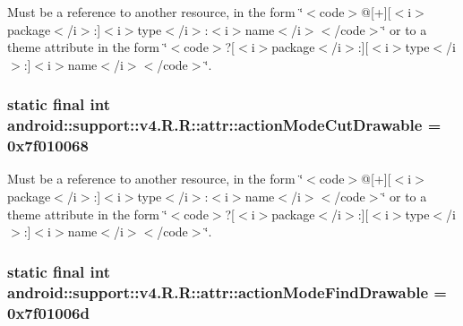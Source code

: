 Must be a reference to another resource, in the form \char`\"{}$<$code$>$@\mbox{[}+\mbox{]}\mbox{[}$<$i$>$package$<$/i$>$:\mbox{]}$<$i$>$type$<$/i$>$:$<$i$>$name$<$/i$>$$<$/code$>$\char`\"{} or to a theme attribute in the form \char`\"{}$<$code$>$?\mbox{[}$<$i$>$package$<$/i$>$:\mbox{]}\mbox{[}$<$i$>$type$<$/i$>$:\mbox{]}$<$i$>$name$<$/i$>$$<$/code$>$\char`\"{}. \hypertarget{classandroid_1_1support_1_1v4_1_1_r_1_1attr_af0edb67fe898da7c0809a12b872b24d}{
\subsubsection[{actionModeCutDrawable}]{\setlength{\rightskip}{0pt plus 5cm}static final int android::support::v4.R.R::attr::actionModeCutDrawable = 0x7f010068}}
\label{classandroid_1_1support_1_1v4_1_1_r_1_1attr_af0edb67fe898da7c0809a12b872b24d}


Must be a reference to another resource, in the form \char`\"{}$<$code$>$@\mbox{[}+\mbox{]}\mbox{[}$<$i$>$package$<$/i$>$:\mbox{]}$<$i$>$type$<$/i$>$:$<$i$>$name$<$/i$>$$<$/code$>$\char`\"{} or to a theme attribute in the form \char`\"{}$<$code$>$?\mbox{[}$<$i$>$package$<$/i$>$:\mbox{]}\mbox{[}$<$i$>$type$<$/i$>$:\mbox{]}$<$i$>$name$<$/i$>$$<$/code$>$\char`\"{}. \hypertarget{classandroid_1_1support_1_1v4_1_1_r_1_1attr_06b60d787984260aa00be5630593ee08}{
\subsubsection[{actionModeFindDrawable}]{\setlength{\rightskip}{0pt plus 5cm}static final int android::support::v4.R.R::attr::actionModeFindDrawable = 0x7f01006d}}
\label{classandroid_1_1support_1_1v4_1_1_r_1_1attr_06b60d787984260aa00be5630593ee08}


